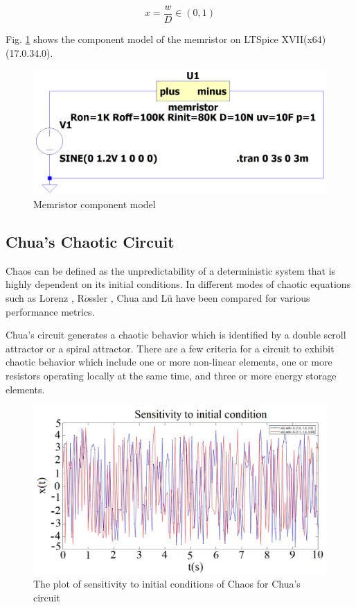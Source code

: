 \begin{equation}
x = \frac{w}{D}\in(0,1)     
\end{equation}

Fig. \ref{fig:memristor} shows the component model of the memristor on LTSpice XVII(x64) (17.0.34.0).
\begin{figure}[ht]
    \centering
    \includegraphics[width = 0.6\linewidth]{figs/Fig2memristor_model.PNG}
    \caption{Memristor component model}
    \label{fig:memristor}
\end{figure}

\subsection*{Chua's Chaotic Circuit}
Chaos can be defined as the unpredictability of a deterministic system that is highly dependent on its initial conditions. In \cite{hedayatipour2021comprehensive} different modes of chaotic equations such as Lorenz \cite{246163}, R$\ddot{o}$ssler \cite{7910544}, Chua \cite{Chua1995} and Lü \cite{ electronics10030359} have been compared for various performance metrics.

 Chua's circuit generates a chaotic behavior which is identified by a double scroll attractor or a spiral attractor. There are a few criteria for a circuit to exhibit chaotic behavior which include one or more non-linear elements, one or more resistors operating locally at the same time, and three or more energy storage elements.


 \begin{figure}[!t]
    \centering
    \includegraphics[width = 0.7\linewidth]{figs/Fig3Chuas_sensitivity.PNG}
    \caption{The plot of sensitivity to initial conditions of Chaos for Chua's circuit}
    \label{fig:incchua}
\end{figure}

